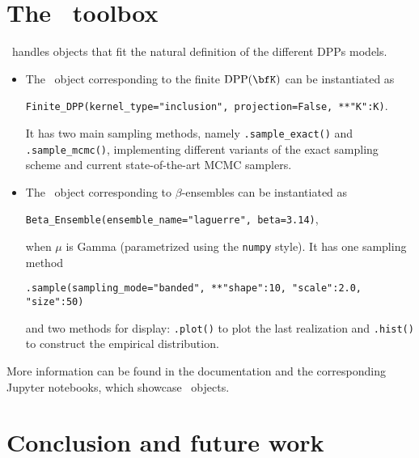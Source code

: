 \documentclass[twoside,11pt]{article}
\begin{document}


\section{The \DPPy\ toolbox} %
\label{sec:the_dppy_toolbox}

  \DPPy\ handles objects that fit the natural definition of the different DPPs models.
  \begin{itemize}
	  \item The \DPPy\ object corresponding to the finite $\DPP(\bfK)$ can be instantiated as
	  \begin{nscenter}
	  	\texttt{Finite_DPP(kernel_type="inclusion", projection=False, **{"K":K})}.
	  \end{nscenter}
		It has two main sampling methods, namely \texttt{.sample_exact()} and \texttt{.sample_mcmc()}, implementing different variants of the exact sampling scheme and current state-of-the-art MCMC samplers.

		\item The \DPPy\ object corresponding to $\beta$-ensembles can be instantiated as
		\begin{nscenter}
			\texttt{Beta_Ensemble(ensemble_name="laguerre", beta=3.14)},
		\end{nscenter}
		when $\mu$ is Gamma (parametrized using the \texttt{numpy} style).
		It has one sampling method
		\begin{nscenter}
			\texttt{.sample(sampling_mode="banded", **{"shape":10, "scale":2.0, "size":50})}
		\end{nscenter}
		and two methods for display: \texttt{.plot()} to plot the last realization and \texttt{.hist()} to construct the empirical distribution.
  \end{itemize}

  More information can be found in the documentation and the corresponding Jupyter notebooks, which showcase \DPPy\ objects.


\section{Conclusion and future work} %
\label{sec:conclusion_and_future_work}
\end{document}
